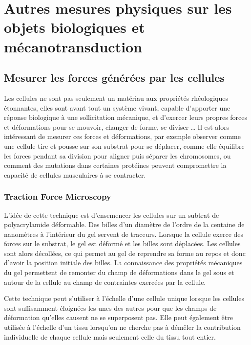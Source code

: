 \section{Autres mesures physiques sur les objets biologiques et mécanotransduction}

 



\subsection{Mesurer les forces générées par les cellules}

Les cellules ne sont pas seulement un matériau aux propriétés rhéologiques étonnantes, elles sont avant tout un système vivant, capable d'apporter une réponse biologique à une sollicitation mécanique, et d'exercer leurs propres forces et déformations pour se mouvoir, changer de forme, se diviser \dots 
Il est alors intéressant de mesurer ces forces et déformations, par exemple observer comme une cellule tire et pousse sur son substrat pour se déplacer, comme elle équilibre les forces pendant sa division pour aligner puis séparer les chromosomes, ou comment des mutations dans certaines protéines peuvent compromettre la capacité de cellules musculaires à se contracter.

\subsubsection{Traction Force Microscopy}

L'idée de cette technique est d'ensemencer les cellules sur un subtrat de polyacrylamide déformable. 
Des billes d'un diamètre de l'ordre de la centaine de nanomètres à l'intérieur du gel servent de traceurs. 
Lorsque la cellule exerce des forces sur le substrat, le gel est déformé et les billes sont déplacées. 
Les cellules sont alors décollées, ce qui permet au gel de reprendre sa forme au repos et donc d'avoir la position initiale des billes. 
La connaissance des propriétés mécaniques du gel permettent de remonter du champ de déformations dans le gel sous et autour de la cellule au champ de contraintes exercées par la cellule. 

Cette technique peut s'utiliser à l'échelle d'une cellule unique lorsque les cellules sont suffisamment éloignées les unes des autres pour que les champs de déformation qu'elles causent ne se superposent pas. 
Elle peut également être utilisée à l'échelle d'un tissu lorsqu'on ne cherche pas à démêler la contribution individuelle de chaque cellule mais seulement celle du tissu tout entier. 

